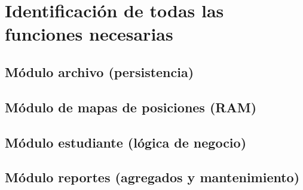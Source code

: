 \section{Identificación de todas las funciones necesarias}

\subsection{Módulo archivo (persistencia)}


\subsection{Módulo de mapas de posiciones (RAM)}



\subsection{Módulo estudiante (lógica de negocio)}


\subsection{Módulo reportes (agregados y mantenimiento)}


